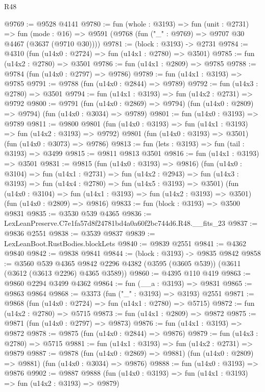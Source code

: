\begin{lexlean}{R48}
\begin{coremodule}
@9769 := @9528 @4141
@9780 := fun (whole : @3193) =>
  fun (unit : @2731) =>
  fun (mode : @16) => @9591 (@9768 (fun ("_" : @9769) => @9707 @30 @4467 (@3637 (@9710 @30))))
@9781 := (block : @3193) -> @2731
@9784 := @4310 (fun (u14x0 : @2724) => fun (u14x1 : @2780) => @3501)
@9785 := fun (u14x2 : @2780) => @3501
@9786 := fun (u14x1 : @2809) => @9785
@9788 := @9784 (fun (u14x0 : @2797) => @9786)
@9789 := fun (u14x1 : @3193) => @9785
@9791 := @9788 (fun (u14x0 : @2844) => @9789)
@9792 := fun (u14x3 : @2780) => @3501
@9794 := fun (u14x1 : @3193) => fun (u14x2 : @2731) => @9792
@9800 := @9791
    (fun (u14x0 : @2869) => @9794)
    (fun (u14x0 : @2809) => @9794)
    (fun (u14x0 : @3034) => @9789)
@9801 := fun (u14x0 : @3193) => @9789
@9811 := @9800
    @9801
    (fun (u14x0 : @3193) => fun (u14x1 : @3193) => fun (u14x2 : @3193) => @9792)
    @9801
    (fun (u14x0 : @3193) => @3501)
    (fun (u14x0 : @3073) => @9786)
@9813 := fun (lets : @3193) => fun (tail : @3193) => @3499
@9815 := @9811 @9813 @3501
@9816 := fun (u14x1 : @3193) => @3501
@9831 := @9815
    (fun (u14x0 : @3193) => @9816)
    (fun (u14x0 : @3104) =>
    fun (u14x1 : @2731) =>
    fun (u14x2 : @2943) =>
    fun (u14x3 : @3193) => fun (u14x4 : @2780) => fun (u14x5 : @3193) => @3501)
    (fun (u14x0 : @3104) => fun (u14x1 : @3193) => fun (u14x2 : @3193) => @3501)
    (fun (u14x0 : @2809) => @9816)
@9833 := fun (block : @3193) => @3500 @9831
@9835 := @3530 @539 @4365
@9836 := LexLeanPreserve.C7e1fa57d8f24781bd4a0a60f2bc744d6.R48.__fits_23
@9837 := @9836 @2551
@9838 := @3539 @9837
@9839 := LexLeanBoot.RustBodies.blockLets
@9840 := @9839 @2551
@9841 := @4362 @9840
@9842 := @9838 @9841
@9844 := (block : @3193) -> @9835 @9842
@9858 := @3560
    @539
    @4365
    @9842
    @2296
    @4382
    (@3595 (@3605 @539))
    (@3611 (@3612 (@3613 @2296) @4365 @3589))
@9860 := @4395 @110 @419
@9863 := @9860 @2294 @3499 @4362
@9864 := fun (__a : @3193) => @9831
@9865 := @9863 @9864
@9868 := @3373 (fun ("_" : @3193) => @3193) @2551
@9871 := @9868 (fun (u14x0 : @2724) => fun (u14x1 : @2780) => @5715)
@9872 := fun (u14x2 : @2780) => @5715
@9873 := fun (u14x1 : @2809) => @9872
@9875 := @9871 (fun (u14x0 : @2797) => @9873)
@9876 := fun (u14x1 : @3193) => @9872
@9878 := @9875 (fun (u14x0 : @2844) => @9876)
@9879 := fun (u14x3 : @2780) => @5715
@9881 := fun (u14x1 : @3193) => fun (u14x2 : @2731) => @9879
@9887 := @9878
    (fun (u14x0 : @2869) => @9881)
    (fun (u14x0 : @2809) => @9881)
    (fun (u14x0 : @3034) => @9876)
@9888 := fun (u14x0 : @3193) => @9876
@9902 := @9887
    @9888
    (fun (u14x0 : @3193) => fun (u14x1 : @3193) => fun (u14x2 : @3193) => @9879)

\end{coremodule}
\end{lexlean}
